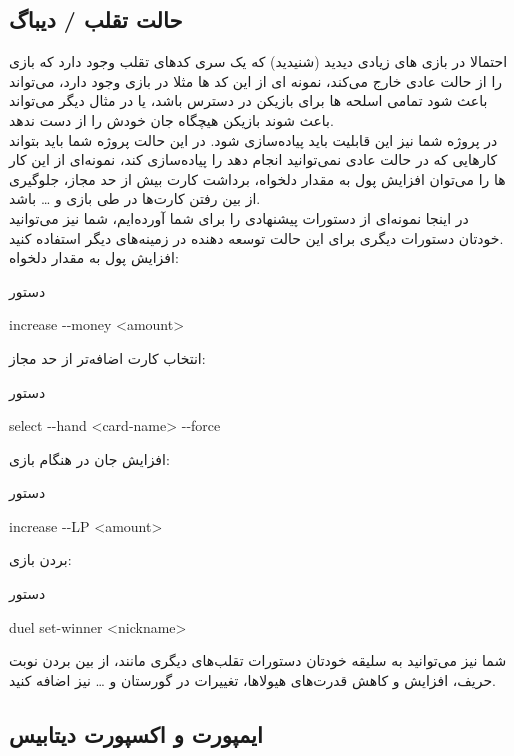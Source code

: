 \documentclass[]{article}
\begin{document}
\subsection*{{\titr حالت تقلب / دیباگ}}
احتمالا در بازی های زیادی دیدید (شنیدید) که یک سری کدهای تقلب وجود دارد که 
بازی را از حالت عادی خارج می‌کند، نمونه ای از این کد ها مثلا در بازی 
وجود دارد، می‌تواند باعث شود تمامی اسلحه ها برای بازیکن در دسترس باشد، یا 
در 
مثال دیگر می‌تواند باعث شوند بازیکن هیچگاه جان خودش را از دست ندهد.
\\
در پروژه شما نیز این قابلیت باید پیاده‌سازی شود. در این حالت پروژه شما باید 
بتواند کارهایی که در حالت عادی نمی‌توانید انجام دهد را  پیاده‌سازی کند، 
نمونه‌ای از این کار ها را می‌توان افزایش پول به مقدار دلخواه، برداشت کارت 
بیش 
از حد مجاز، جلوگیری از بین رفتن کارت‌ها در طی بازی و … باشد.
\\
در اینجا نمونه‌ای از دستورات پیشنهادی را برای شما آورده‌ایم، شما نیز می‌توانید 
خودتان دستورات دیگری برای این حالت توسعه دهنده در زمینه‌های دیگر استفاده 
کنید. 
\\
افزایش پول به مقدار دلخواه:
\begin{mybox}[colback=yellow]{دستور}
	\begin{latin}	
		increase -{}-money <amount>
	\end{latin}
\end{mybox}
انتخاب کارت اضافه‌تر از حد مجاز:
\begin{mybox}[colback=yellow]{دستور}
	\begin{latin}	
		select -{}-hand <card-name> -{}-force
	\end{latin}
\end{mybox}
    افزایش جان در هنگام بازی:
\begin{mybox}[colback=yellow]{دستور}
	\begin{latin}	
		increase -{}-LP <amount>
	\end{latin}
\end{mybox}
    بردن بازی:
\begin{mybox}[colback=yellow]{دستور}
	\begin{latin}	
	duel set-winner <nickname>
	\end{latin}
\end{mybox}
شما نیز می‌توانید به سلیقه خودتان دستورات تقلب‌های دیگری مانند، از بین بردن 
نوبت حریف، افزایش و کاهش قدرت‌های هیولاها، تغییرات در گورستان و … نیز اضافه 
کنید.

\subsection*{{\titr ایمپورت و اکسپورت دیتابیس }}
\end{document}
